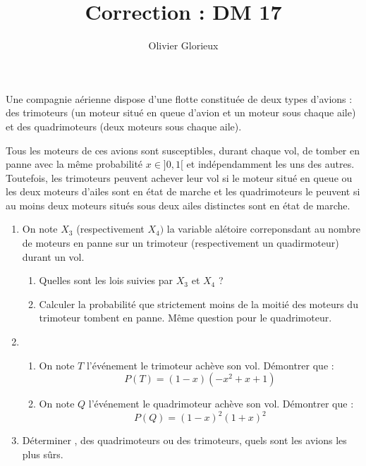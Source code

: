 \documentclass[a4paper, 11pt,reqno]{article}
\author{Olivier Glorieux}
\begin{document}
\title{Correction : DM 17}




\begin{exercice}[D'après G2E 2014]
Une compagnie aérienne dispose d’une flotte constituée de deux types d’avions : des trimoteurs (un moteur situé en queue d’avion et un moteur sous chaque aile) et des quadrimoteurs (deux moteurs sous chaque aile).

Tous les moteurs de ces avions sont susceptibles, durant chaque vol, de tomber en panne avec la même probabilité $x\in ]0,1[$ et indépendamment les uns des autres. Toutefois, les trimoteurs peuvent achever leur vol si le moteur situé en queue ou les deux moteurs d’ailes sont en  état de marche et les quadrimoteurs le peuvent si au moins deux moteurs situés sous deux ailes distinctes sont en  état de marche.

\begin{enumerate}
\item On note $X_3 $ (respectivement $X_4)$ la variable alétoire correponsdant au nombre de moteurs en panne sur un trimoteur (respectivement un quadirmoteur) durant un vol.
\begin{enumerate}
\item Quelles sont les lois suivies par $X_3$ et  $X_4$ ? 
\item Calculer la probabilité que strictement moins de la moitié des moteurs du trimoteur tombent en panne. Même question pour le quadrimoteur. 
\end{enumerate}
\item 
\begin{enumerate}
\item On note $T$ l'événement \og le trimoteur achève son vol\fg. Démontrer que : 
$$P(T) =(1-x)(-x^2+x+1)$$
\item On note $Q$ l'événement \og le quadrimoteur achève son vol\fg. Démontrer que : 
$$P(Q) =(1-x)^2(1+x)^2$$

\end{enumerate}
\item Déterminer , des quadrimoteurs ou des trimoteurs, quels sont les avions les plus sûrs. 
\end{enumerate}
\end{exercice}
\end{document}
